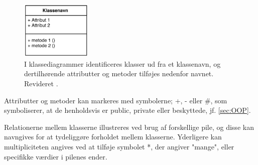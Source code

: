 \begin{figure} [H]
\centering
\includegraphics[width=0.3\textwidth]{figures/klassediag}
\caption{I klassediagrammer identificeres klasser ud fra et klassenavn, og dertilhørende attributter og metoder tilføjes nedenfor navnet. Revideret \cite{Fowler2004}.}
\label{fig:klassediagram}
\end{figure}

\noindent
Attributter og metoder kan markeres med symbolerne; +, - eller \#, som symboliserer, at de henholdsvis er public, private eller beskyttede, jf. \autoref{sec:OOP}.

Relationerne mellem klasserne illustreres ved brug af forskellige pile, og disse kan navngives for at tydeliggøre forholdet mellem  klasserne. Yderligere kan multipliciteten angives ved at tilføje symbolet *, der angiver "mange", eller specifikke værdier i pilenes ender. 
